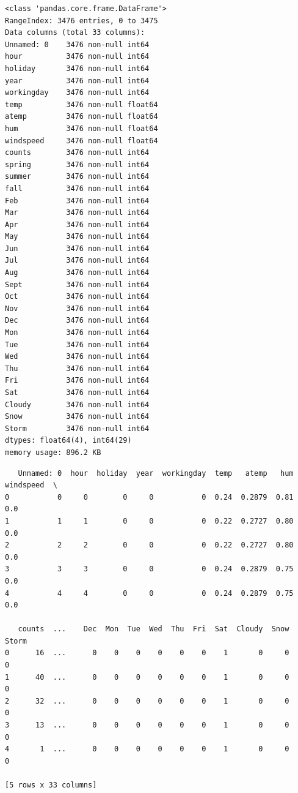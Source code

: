 \documentclass[11pt]{article}
\begin{document}
    \begin{Verbatim}[commandchars=\\\{\}]
<class 'pandas.core.frame.DataFrame'>
RangeIndex: 3476 entries, 0 to 3475
Data columns (total 33 columns):
Unnamed: 0    3476 non-null int64
hour          3476 non-null int64
holiday       3476 non-null int64
year          3476 non-null int64
workingday    3476 non-null int64
temp          3476 non-null float64
atemp         3476 non-null float64
hum           3476 non-null float64
windspeed     3476 non-null float64
counts        3476 non-null int64
spring        3476 non-null int64
summer        3476 non-null int64
fall          3476 non-null int64
Feb           3476 non-null int64
Mar           3476 non-null int64
Apr           3476 non-null int64
May           3476 non-null int64
Jun           3476 non-null int64
Jul           3476 non-null int64
Aug           3476 non-null int64
Sept          3476 non-null int64
Oct           3476 non-null int64
Nov           3476 non-null int64
Dec           3476 non-null int64
Mon           3476 non-null int64
Tue           3476 non-null int64
Wed           3476 non-null int64
Thu           3476 non-null int64
Fri           3476 non-null int64
Sat           3476 non-null int64
Cloudy        3476 non-null int64
Snow          3476 non-null int64
Storm         3476 non-null int64
dtypes: float64(4), int64(29)
memory usage: 896.2 KB

    \end{Verbatim}

    
    \begin{verbatim}
   Unnamed: 0  hour  holiday  year  workingday  temp   atemp   hum  windspeed  \
0           0     0        0     0           0  0.24  0.2879  0.81        0.0   
1           1     1        0     0           0  0.22  0.2727  0.80        0.0   
2           2     2        0     0           0  0.22  0.2727  0.80        0.0   
3           3     3        0     0           0  0.24  0.2879  0.75        0.0   
4           4     4        0     0           0  0.24  0.2879  0.75        0.0   

   counts  ...    Dec  Mon  Tue  Wed  Thu  Fri  Sat  Cloudy  Snow  Storm  
0      16  ...      0    0    0    0    0    0    1       0     0      0  
1      40  ...      0    0    0    0    0    0    1       0     0      0  
2      32  ...      0    0    0    0    0    0    1       0     0      0  
3      13  ...      0    0    0    0    0    0    1       0     0      0  
4       1  ...      0    0    0    0    0    0    1       0     0      0  

[5 rows x 33 columns]
    \end{verbatim}
\end{document}
